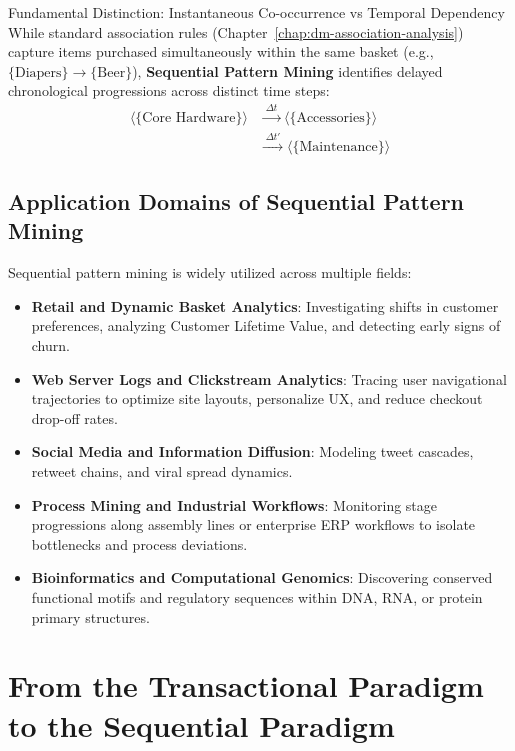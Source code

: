 \begin{noteblock}{Fundamental Distinction: Instantaneous Co-occurrence vs Temporal Dependency}
    While standard association rules (Chapter~\ref{chap:dm-association-analysis}) capture items purchased simultaneously within the same basket (e.g., $\{\text{Diapers}\} \rightarrow \{\text{Beer}\}$), \textbf{Sequential Pattern Mining} identifies delayed chronological progressions across distinct time steps:
    \begin{align*}
    \langle \{\text{Core Hardware}\} \rangle &\xrightarrow{\;\Delta t\;} \langle \{\text{Accessories}\} \rangle \\
    &\xrightarrow{\;\Delta t'\;} \langle \{\text{Maintenance}\} \rangle
    \end{align*}
\end{noteblock}

\subsection{Application Domains of Sequential Pattern Mining}
Sequential pattern mining is widely utilized across multiple fields:
\begin{itemize}
    \item \textbf{Retail and Dynamic Basket Analytics}: Investigating shifts in customer preferences, analyzing Customer Lifetime Value, and detecting early signs of churn.
    \item \textbf{Web Server Logs and Clickstream Analytics}: Tracing user navigational trajectories to optimize site layouts, personalize UX, and reduce checkout drop-off rates.
    \item \textbf{Social Media and Information Diffusion}: Modeling tweet cascades, retweet chains, and viral spread dynamics.
    \item \textbf{Process Mining and Industrial Workflows}: Monitoring stage progressions along assembly lines or enterprise ERP workflows to isolate bottlenecks and process deviations.
    \item \textbf{Bioinformatics and Computational Genomics}: Discovering conserved functional motifs and regulatory sequences within DNA, RNA, or protein primary structures.
\end{itemize}

\section{From the Transactional Paradigm to the Sequential Paradigm}
\label{sec:dm-from-itemsets-to-sequences}

